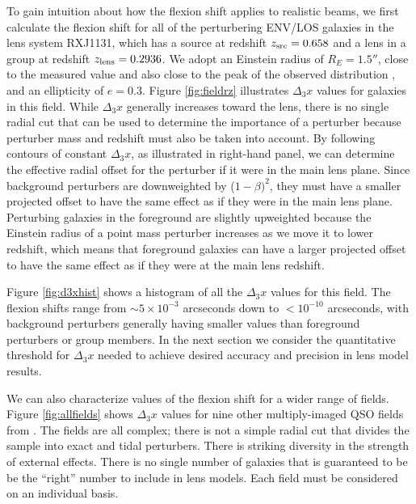 \documentclass{emulateapj}
\begin{document}
To gain intuition about how the flexion shift applies to realistic beams, we first calculate the flexion shift for all of the perturbering ENV/LOS galaxies in the lens system RXJ1131, which has a source at redshift $z_{\rm{src}} = 0.658$ and a lens in a group at redshift $z_{\rm{lens}} = 0.2936$.  We adopt an Einstein radius of $R_E = 1.5''$, close to the measured value \citep{Suyu13} and also close to the peak of the observed distribution \citep{Sonnenfeld13}, and an ellipticity of $e=0.3$.  Figure \ref{fig:fieldrz} illustrates $\Delta_3 x$ values for galaxies in this field.  While $\Delta_3 x$ generally increases toward the lens, there is no single radial cut that can be used to determine the importance of a perturber because perturber mass and redshift must also be taken into account.  By following contours of constant $\Delta_3 x$, as illustrated in right-hand panel, we can determine the effective radial offset for the perturber if it were in the main lens plane. Since background perturbers are downweighted by ($1-\beta)^2$, they must have a smaller projected offset to have the same effect as if they were in the main lens plane. Perturbing galaxies in the foreground are slightly upweighted because the Einstein radius of a point mass perturber increases as we move it to lower redshift, which means that foreground galaxies can have a larger projected offset to have the same effect as if they were at the main lens redshift.

Figure \ref{fig:d3xhist} shows a histogram of all the $\Delta_3 x$ values for this field.  The flexion shifts range from $\sim 5 \times 10^{-3}$ arcseconds down to $<10^{-10}$ arcseconds, with background perturbers generally having smaller values than foreground perturbers or group members.  In the next section we consider the quantitative threshold for $\Delta_3 x$ needed to achieve desired accuracy and precision in lens model results.

We can also characterize values of the flexion shift for a wider range of fields.  Figure \ref{fig:allfields} shows $\Delta_3 x$ values for nine other multiply-imaged QSO fields from \citet{Wong11}.  The fields are all complex; there is not a simple radial cut that divides the sample into exact and tidal perturbers.  There is striking diversity in the strength of external effects.  There is no single number of galaxies that is guaranteed to be be the ``right'' number to include in lens models.  Each field must be considered on an individual basis.
\end{document}
